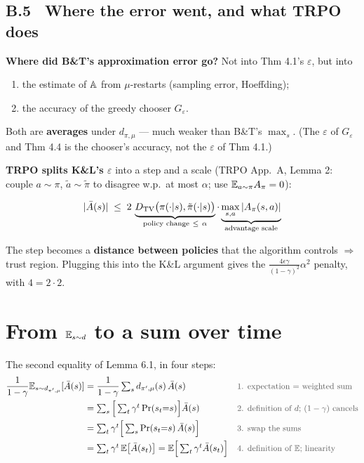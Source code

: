 \subsection*{B.5 \ Where the error went, and what TRPO does}

\textbf{Where did B\&T's approximation error go?} Not into Thm 4.1's $\varepsilon$, but into
\begin{enumerate}
  \item the estimate of $\mathbb{A}$ from $\mu$-restarts (sampling error, Hoeffding);
  \item the accuracy of the greedy chooser $G_\varepsilon$.
\end{enumerate}
Both are \textbf{averages} under $d_{\pi,\mu}$ --- much weaker than B\&T's $\max_s$. (The $\varepsilon$ of $G_\varepsilon$ and Thm 4.4 is the chooser's accuracy, not the $\varepsilon$ of Thm 4.1.)

\textbf{TRPO splits K\&L's $\varepsilon$} into a step and a scale (TRPO App.~A, Lemma 2: couple $a\sim\pi$, $\tilde a\sim\tilde\pi$ to disagree w.p.\ at most $\alpha$; use $\mathbb{E}_{a\sim\pi}A_\pi=0$):
\begin{eqbox}
\begin{gather*}
  |\bar A(s)| \;\le\; 2\,\underbrace{\DTV\big(\pi(\cdot|s),\tilde\pi(\cdot|s)\big)}_{\text{policy change}\ \le\ \alpha}\cdot\underbrace{\max_{s,a}|A_\pi(s,a)|}_{\text{advantage scale}}
\end{gather*}
\end{eqbox}
\begin{keybox}
The step becomes a \textbf{distance between policies} that the algorithm controls $\Rightarrow$ trust region. Plugging this into the K\&L argument gives the $\frac{4\epsilon\gamma}{(1-\gamma)^2}\alpha^2$ penalty, with $4=2\cdot2$.
\end{keybox}

\section{From $\mathbb{E}_{s\sim d}$ to a sum over time}
\label{app:sumswap}

The second equality of Lemma 6.1, in four steps:
\begin{gather*}
  \begin{aligned}
    \frac{1}{1-\gamma}\E_{s\sim d_{\pi',\mu}}[\bar A(s)] &= \frac{1}{1-\gamma}\textstyle\sum_s d_{\pi',\mu}(s)\,\bar A(s) && \text{\small\color{NoteGray}1. expectation = weighted sum}\\
    &= \textstyle\sum_s \Big[\sum_t \gamma^t \Pr(s_t{=}s)\Big]\bar A(s) && \text{\small\color{NoteGray}2. definition of $d$; $(1-\gamma)$ cancels}\\
    &= \textstyle\sum_t \gamma^t \Big[\sum_s \Pr(s_t{=}s)\,\bar A(s)\Big] && \text{\small\color{NoteGray}3. swap the sums}\\
    &= \textstyle\sum_t \gamma^t\, \E\big[\bar A(s_t)\big] = \E\Big[\sum_t \gamma^t \bar A(s_t)\Big] && \text{\small\color{NoteGray}4. definition of $\E$; linearity}
  \end{aligned}
\end{gather*}

